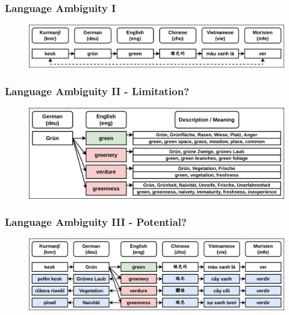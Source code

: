 \documentclass[aspectratio=169]{beamer}
\begin{document}
\begin{frame}[fragile]
\end{frame}



\begin{frame}[fragile]
	\frametitle{Language Ambiguity I}
    \begin{figure}
        \centering
        \includegraphics[width=1.0\textwidth]{images/CRAMT-Tool-WordAlignmentExample.png} 
    \end{figure}
\end{frame}

\begin{frame}[fragile]
	\frametitle{Language Ambiguity II - Limitation?}
    \begin{figure}
        \centering
        \includegraphics[width=1.0\textwidth]{images/CRAMT-Tool-WordAlignmentLimitation.png} 
    \end{figure}
\end{frame}

\begin{frame}[fragile]
	\frametitle{Language Ambiguity III - Potential?}
    \begin{figure}
        \centering
        \includegraphics[width=1.0\textwidth]{images/CRAMT-Tool-WordAlignmentLimitationExample.png} 
    \end{figure}
\end{frame}
\end{document}
